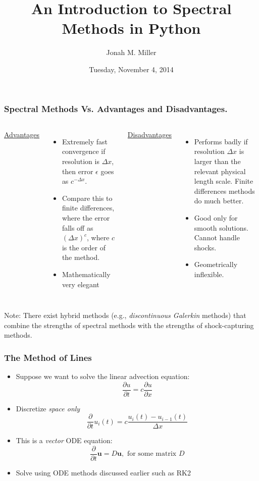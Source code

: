 \documentclass[]{beamer}
\title[spectral]{An Introduction to Spectral Methods in Python}
\author[J. Miller]{Jonah M. Miller}
\institute[PI]{Perimeter Institute}
\date[November 2014]{Tuesday, November 4, 2014}
\newcommand{\myvec}[1]{\mathbf{#1}} %
\newcommand{\pd}[2]{\frac{\partial #1}{\partial #2}}
\newcommand{\pdd}[1]{\frac{\partial}{\partial #1}}
\begin{document}
\begin{frame}[plain]
\titlepage
\end{frame}

\begin{frame}
  \frametitle{Spectral Methods Vs. Advantages and Disadvantages.}
  \begin{columns}
    \column{6cm}
    \begin{center}{\Large\underline{Advantages}}\end{center}
    \begin{itemize}
    \item Extremely fast convergence if resolution is $\Delta x$, then
      error $\epsilon$ goes as $c^{-\Delta x}$. 
    \item Compare this to finite differences, where the error falls
      off as $(\Delta x)^c$, where $c$ is the order of the method.
      \item Mathematically very elegant
    \end{itemize}
    \column{6cm}
    \begin{center}{\Large\underline{Disadvantages}}\end{center}
    \begin{itemize}
    \item Performs badly if resolution $\Delta x$ is larger than the
      relevant physical length scale. Finite differences methods do
      much better.
    \item Good only for smooth solutions. Cannot handle shocks.
    \item Geometrically inflexible. 
    \end{itemize}
  \end{columns}
  \pause
    \begin{block}{Note:}
      There exist hybrid methods (e.g., \textit{discontinuous Galerkin}
        methods) that combine the strengths of spectral methods with
      the strengths of shock-capturing methods.
    \end{block}
\end{frame}

\begin{frame}
  \frametitle{The Method of Lines}
  \pause
  \begin{itemize}
    \item Suppose we want to solve the linear advection equation:
      $$\pd{u}{t} = c \pd{u}{x}$$
      \pause
    \item Discretize \textit{space only}
      $$\pdd{t}{u_i(t)} = c \frac{u_i(t) - u_{i-1}(t)}{\Delta x}$$
      \pause
    \item This is a \textit{vector} ODE equation:
      $$\pdd{t}\myvec{u} = D \myvec{u},\text{ for some matrix }D$$
      \pause
    \item Solve using ODE methods discussed earlier such as RK2
  \end{itemize}
\end{frame}
\end{document}

